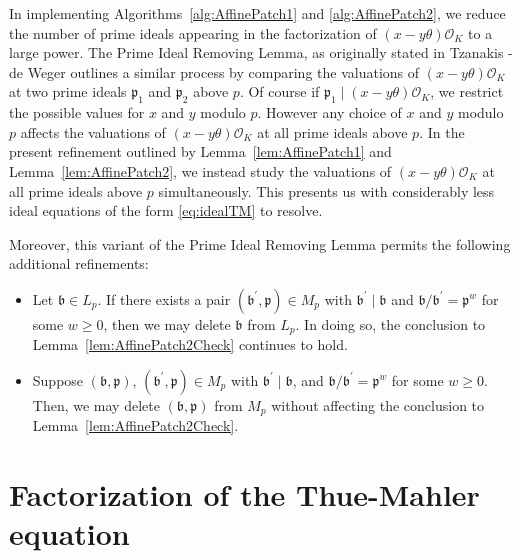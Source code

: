 In implementing Algorithms~\ref{alg:AffinePatch1} and \ref{alg:AffinePatch2}, we reduce the number of prime ideals appearing in the factorization of $(x-y\theta)\mathcal{O}_K$ to a large power. The Prime Ideal Removing Lemma, as originally stated in Tzanakis - de Weger outlines a similar process by comparing the valuations of $(x-y\theta)\mathcal{O}_K$ at two prime ideals $\mathfrak{p}_1$ and $\mathfrak{p}_2$ above $p$. Of course if $\mathfrak{p}_1 \mid (x-y\theta)\mathcal{O}_K$, we restrict the possible values for $x$ and $y$ modulo $p$. However any choice of $x$ and $y$ modulo $p$ affects the valuations of $(x-y\theta)\mathcal{O}_K$ at all prime ideals above $p$. In the present refinement outlined by Lemma~\ref{lem:AffinePatch1} and Lemma~\ref{lem:AffinePatch2}, we instead study the valuations of $(x-y\theta)\mathcal{O}_K$ at all prime ideals above $p$ simultaneously. This presents us with considerably less ideal equations of the form \ref{eq:idealTM} to resolve. 

Moreover, this variant of the Prime Ideal Removing Lemma permits the following additional refinements:
\begin{itemize}
\item Let $\mathfrak{b} \in L_p$. If there exists a pair $(\mathfrak{b}^\prime,\mathfrak{p}) \in M_p$ with $\mathfrak{b}^\prime \mid \mathfrak{b}$ and $\mathfrak{b}/\mathfrak{b}^\prime=\mathfrak{p}^w$
for some $w \ge 0$, then we may delete $\mathfrak{b}$ from $L_p$. In doing so, the conclusion to Lemma~\ref{lem:AffinePatch2Check} continues to hold.
\item Suppose $(\mathfrak{b},\mathfrak{p})$, $(\mathfrak{b}^\prime,\mathfrak{p}) \in M_p$ with $\mathfrak{b}^{\prime} \mid \mathfrak{b}$, and $\mathfrak{b}/\mathfrak{b}^{\prime}=\mathfrak{p}^w$ for some ${w \geq 0}$. Then, we may delete $(\mathfrak{b},\mathfrak{p})$ from $M_p$ without affecting the conclusion to Lemma~\ref{lem:AffinePatch2Check}. 
\end{itemize}


\section{Factorization of the Thue-Mahler equation}
\label{sec:FactorizationTM}

